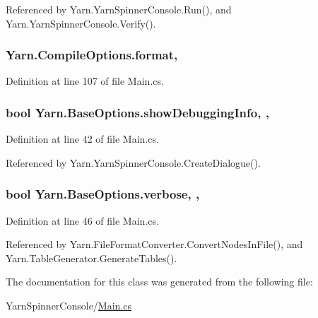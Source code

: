 Referenced by Yarn.\-Yarn\-Spinner\-Console.\-Run(), and Yarn.\-Yarn\-Spinner\-Console.\-Verify().

\hypertarget{a00055_a9904ccfb1b0ff64df415c4fc9fe6eb1c}{
\subsubsection[{format}]{ Yarn.\-Compile\-Options.\-format\hspace{0.3cm}{\ttfamily [get]}, {\ttfamily [set]}}}\label{a00055_a9904ccfb1b0ff64df415c4fc9fe6eb1c}


Definition at line 107 of file Main.\-cs.

\hypertarget{a00041_a89964ea17bd19caf00cb5bff563ed01c}{
\subsubsection[{show\-Debugging\-Info}]{\setlength{\rightskip}{0pt plus 5cm}bool Yarn.\-Base\-Options.\-show\-Debugging\-Info\hspace{0.3cm}{\ttfamily [get]}, {\ttfamily [set]}, {\ttfamily [inherited]}}}\label{a00041_a89964ea17bd19caf00cb5bff563ed01c}


Definition at line 42 of file Main.\-cs.



Referenced by Yarn.\-Yarn\-Spinner\-Console.\-Create\-Dialogue().

\hypertarget{a00041_ada4d83d1756918f362d55f6649b82b17}{
\subsubsection[{verbose}]{\setlength{\rightskip}{0pt plus 5cm}bool Yarn.\-Base\-Options.\-verbose\hspace{0.3cm}{\ttfamily [get]}, {\ttfamily [set]}, {\ttfamily [inherited]}}}\label{a00041_ada4d83d1756918f362d55f6649b82b17}


Definition at line 46 of file Main.\-cs.



Referenced by Yarn.\-File\-Format\-Converter.\-Convert\-Nodes\-In\-File(), and Yarn.\-Table\-Generator.\-Generate\-Tables().



The documentation for this class was generated from the following file\-:\begin{DoxyCompactItemize}
\item 
Yarn\-Spinner\-Console/\hyperlink{a00325}{Main.\-cs}\end{DoxyCompactItemize}

